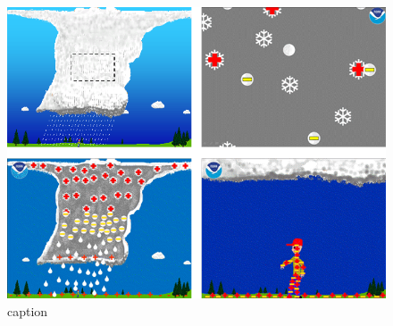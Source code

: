 \documentclass[12pt,oneside]{book}
\begin{document}
\begin{figure}

{\centering \includegraphics[width=0.8\linewidth]{figures/FigureE6} 

}

\caption{caption}\label{fig:ElectrificationofClouds}
\end{figure}
\end{document}

